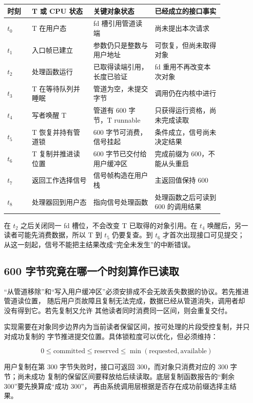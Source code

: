 \begin{longtable}{|L{0.10\linewidth}|L{0.25\linewidth}|L{0.25\linewidth}|L{0.28\linewidth}|}
\hline
时刻 & T 或 CPU 状态 & 关键对象状态 & 已经成立的接口事实 \\ \hline
\(t_0\) & T 在用户态 & fd 槽引用管道读端 & 尚未提出本次请求 \\ \hline
\(t_1\) & 入口帧已建立 & 参数仍只是整数与用户地址 & 可恢复，但尚未取得对象 \\ \hline
\(t_2\) & 处理函数运行 & 已取得读端引用，长度已验证 & fd 重用不再改变本次对象 \\ \hline
\(t_3\) & T 在等待队列并睡眠 & 管道为空，未提交字节 & 调用仍在内核中进行 \\ \hline
\(t_4\) & 写者唤醒 T & 管道有 600 字节，T runnable & 只获得运行资格，尚未完成读取 \\ \hline
\(t_5\) & T 恢复并持有管道锁 & 600 字节可消费，信号挂起 & 条件成立，信号尚未决定结果 \\ \hline
\(t_6\) & T 复制并推进读位置 & 600 字节已交付给用户缓冲区 & 完成前缀为 600，不能从头重启 \\ \hline
\(t_7\) & 返回工作选择信号 & 信号帧构造在用户栈 & 主返回值保持 600 \\ \hline
\(t_8\) & 处理器回到用户态 &  指向信号处理函数 & 处理函数之后可读到 600 的调用结果 \\ \hline
\end{longtable}

在 \(t_2\) 之后关闭同一 fd 槽位，不会改变 T 已取得的对象引用。在 \(t_4\) 唤醒后，另一
读者可能先消费数据，所以 T 到 \(t_5\) 仍要复查。到 \(t_6\) 才首次出现接口可见提交；
从这一刻起，信号不能把主结果改成“完全未发生”的中断错误。

\subsection{600 字节究竟在哪一个时刻算作已读取}

“从管道移除”和“写入用户缓冲区”必须安排成不会无故丢失数据的协议。若先推进管道读位置，
随后用户页故障且复制无法完成，数据已经从管道消失，调用者却没有得到它。若先复制又允许
其他读者同时消费同一区间，则会重复交付。

实现需要在对象同步边界内为当前读者保留区间，按可处理的片段受控复制，并只对成功复制的
字节推进提交位置。具体锁粒度可以优化，但必须维持：

\[
0 \leq \text{committed} \leq \text{reserved} \leq
\min(\text{requested},\text{available})
\]

用户复制在第 300 字节失败时，接口可返回 300，而对象只消费对应的 300 字节；尚未成功
复制的保留区间要释放给后续读取。底层复制函数报告的“剩余 300”要先换算成“成功 300”，
再由系统调用层根据是否存在成功前缀选择主结果。

